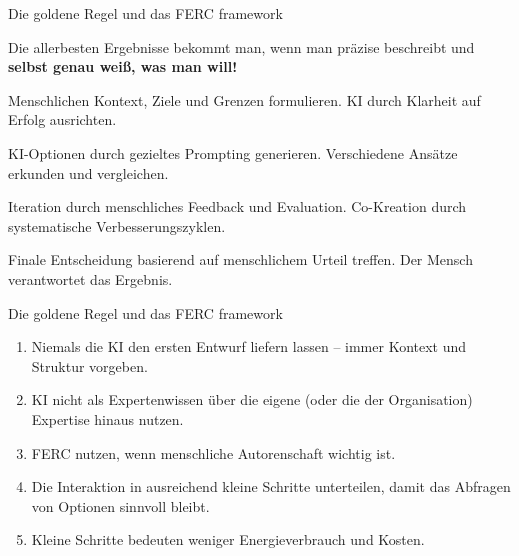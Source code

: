 \documentclass[aspectratio=\BeamerAspectRatio]{beamer}
\begin{document}
\begin{frame}{Die goldene Regel und das FERC framework}
\footnotesize
\begin{myalert}
        Die allerbesten Ergebnisse bekommt man, wenn man präzise beschreibt und \textbf{selbst genau weiß, was man will!}
    \end{myalert}
\begin{mynote}
            \begin{description}[Explore]\setlength{\itemsep}{1pt}
                \item[Frame] Menschlichen Kontext, Ziele und Grenzen formulieren. KI durch Klarheit auf Erfolg ausrichten.
                \item[Explore] KI-Optionen durch gezieltes Prompting generieren. Verschiedene Ansätze erkunden und vergleichen.
                \item[Refine] Iteration durch menschliches Feedback und Evaluation. Co-Kreation durch systematische Verbesserungszyklen.
                \item[Commit] Finale Entscheidung basierend auf menschlichem Urteil treffen. Der Mensch verantwortet das Ergebnis.
            \end{description}
        \end{mynote}
\end{frame}

\begin{frame}{Die goldene Regel und das FERC framework}
\small
\begin{mynote}[Anwendungsprinzipien]
            \begin{enumerate}
                \item Niemals die KI den ersten Entwurf liefern lassen -- immer Kontext und Struktur vorgeben.
                \item KI nicht als Expertenwissen über die eigene (oder die der Organisation) Expertise hinaus nutzen.
                \item FERC nutzen, wenn menschliche Autorenschaft wichtig ist.
                \item Die Interaktion in ausreichend kleine Schritte unterteilen, damit das Abfragen von Optionen sinnvoll bleibt.
                \item Kleine Schritte bedeuten weniger Energieverbrauch und Kosten.
            \end{enumerate}
        \end{mynote}
\end{frame}
\end{document}

